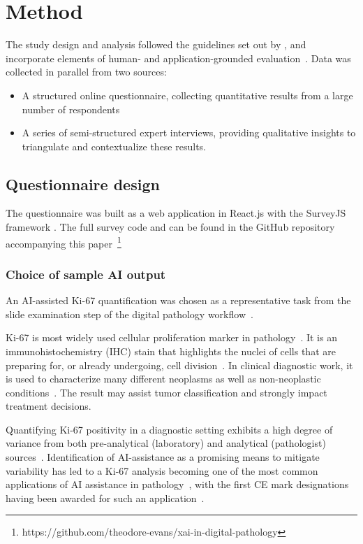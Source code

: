 \section{Method}
\label{sec:method}

The study design and analysis followed the guidelines set out by \citet{runeson_guidelines_2008}, and incorporate elements of human- and application-grounded evaluation~\cite{doshi2017towards}. Data was collected in parallel from two sources:

\begin{itemize}
    \item A structured online questionnaire, collecting quantitative results from a large number of respondents
    \item A series of semi-structured expert interviews, providing qualitative insights to triangulate and contextualize these results. 
\end{itemize}

\subsection{Questionnaire design}

The questionnaire was built as a web application in React.js with the SurveyJS framework \cite{devsoft-baltic-ou-2021}. The full survey code and can be found in the GitHub repository accompanying this paper~\footnote{https://github.com/theodore-evans/xai-in-digital-pathology}


\subsubsection{Choice of sample AI output}

An AI-assisted Ki-67 quantification was chosen as a representative task from the slide examination step of the digital pathology workflow~\cite{Kargl-et-al:2020:PathoWorkflows}.

Ki-67 is most widely used cellular proliferation marker in pathology~\cite{li2015ki67}. It is an immunohistochemistry (IHC) stain that highlights the nuclei of cells that are preparing for, or already undergoing, cell division~\cite{scholzen2000ki}. In clinical diagnostic work, it is used to characterize many different neoplasms as well as non-neoplastic conditions~\cite{nadler2013ki}. The result may assist tumor classification and strongly impact treatment decisions. 

Quantifying Ki-67 positivity in a diagnostic setting exhibits a high degree of variance from both pre-analytical (laboratory) and analytical (pathologist) sources~\cite{polley2015international, rimm2019international}. Identification of AI-assistance as a promising means to mitigate variability has led to a Ki-67 analysis becoming one of the most common applications of AI assistance in pathology~\cite{geread2021pinet, lakshmi2020deep, govind2020improving}, with the first CE mark designations having been awarded for such an application~\cite{business-wire-2021}.  

